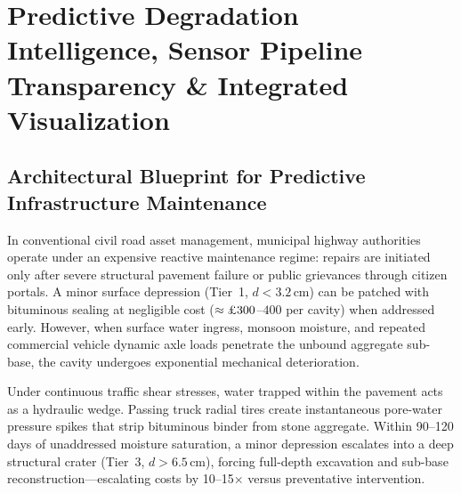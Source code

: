 
\section{Predictive Degradation Intelligence, Sensor Pipeline Transparency \& Integrated Visualization}
\label{sec:predictive_and_integrated_dashboard}

\subsection{Architectural Blueprint for Predictive Infrastructure Maintenance}
In conventional civil road asset management, municipal highway authorities operate under an expensive reactive maintenance regime: repairs are initiated only after severe structural pavement failure or public grievances through citizen portals. A minor surface depression (Tier~1, $d < 3.2\,\text{cm}$) can be patched with bituminous sealing at negligible cost ($\approx \text{\textsterling}300$--$400$ per cavity) when addressed early. However, when surface water ingress, monsoon moisture, and repeated commercial vehicle dynamic axle loads penetrate the unbound aggregate sub-base, the cavity undergoes exponential mechanical deterioration.

Under continuous traffic shear stresses, water trapped within the pavement acts as a hydraulic wedge. Passing truck radial tires create instantaneous pore-water pressure spikes that strip bituminous binder from stone aggregate. Within 90--120 days of unaddressed moisture saturation, a minor depression escalates into a deep structural crater (Tier~3, $d > 6.5\,\text{cm}$), forcing full-depth excavation and sub-base reconstruction---escalating costs by 10--15$\times$ versus preventative intervention.

